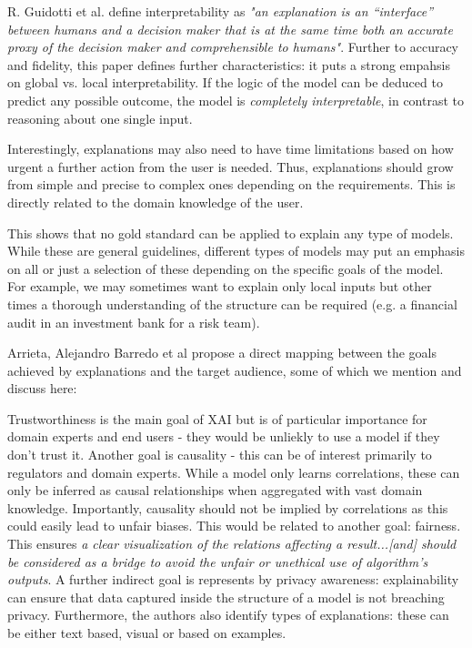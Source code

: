 \documentclass[proposal]{softeng}
\begin{document}
R. Guidotti et al. \cite{guidotti} define interpretability as \textit{"an explanation is an
“interface” between humans and a decision maker that is at the same time both an accurate proxy of the decision maker and comprehensible to humans"}. Further to accuracy and fidelity, this paper defines further characteristics: it puts a strong empahsis on global vs. local interpretability. If the logic of the model can be deduced to predict any possible outcome, the model is \textit{completely interpretable}, in contrast to reasoning about one single input. 

Interestingly, explanations may also need to have time limitations based on how urgent a further action from the user is needed. Thus, explanations should grow from simple and precise to complex ones depending on the requirements. This is directly related to the domain knowledge of the user.

This shows that no gold standard can be applied to explain any type of models. While these are general guidelines, different types of models may put an emphasis on all or just a selection of these depending on the specific goals of the model. For example, we may sometimes want to explain only local inputs but other times a thorough understanding of the structure can be required (e.g. a financial audit in an investment bank for a risk team). 

Arrieta, Alejandro Barredo et al\cite{BarredoArrietaAlejandro2020EAIX} propose a direct mapping between the goals achieved by explanations and the target audience, some of which we mention and discuss here:

Trustworthiness is the main goal of XAI but is of particular importance for domain experts and end users - they would be unliekly to use a model if they don't trust it. Another goal is causality - this can be of interest primarily to regulators and domain experts. While a model only learns correlations, these can only be inferred as causal relationships when aggregated with vast domain knowledge. Importantly, causality should not be implied by correlations as this could easily lead to unfair biases. This would be related to another goal: fairness. This ensures \textit{a clear visualization of the relations affecting a result...[and] should be considered as a bridge to avoid the unfair or unethical use of algorithm’s outputs}. A further indirect goal is represents by privacy awareness: explainability can ensure that data captured inside the structure of a model is not breaching privacy. Furthermore, the authors also identify types of explanations: these can be either text based, visual or based on examples.
\end{document}
